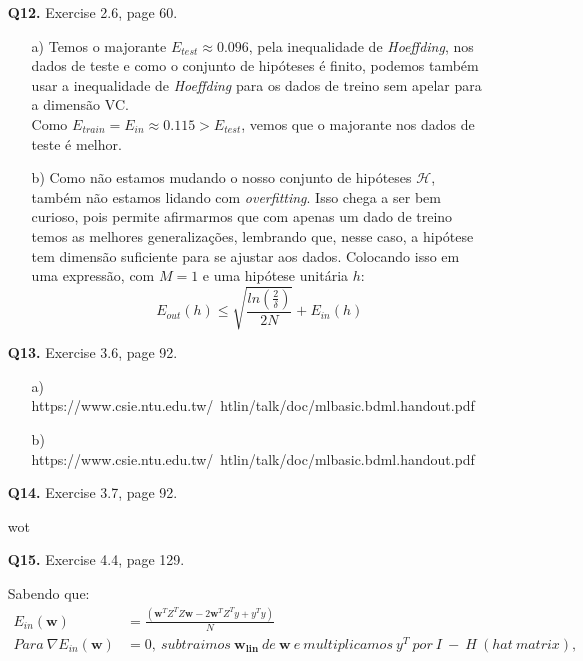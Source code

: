 \documentclass[12pt]{article}
\begin{document}
\begin{enumerate}
\item [\textbf{Q12.}] Exercise 2.6, page 60.
	\begin{addmargin}[1em]{2em}
		\begin{itemize}
			\item[a)] Temos o majorante $E_{test} \approx 0.096$, pela inequalidade de \textit{Hoeffding}, nos dados de teste e como o conjunto de hipóteses é finito, podemos também usar a inequalidade de \textit{Hoeffding} para os dados de treino sem apelar para a dimensão VC.\\
			Como $E_{train} = E_{in} \approx 0.115 > E_{test}$, vemos que o majorante nos dados de teste é melhor.
			\item[b)] Como não estamos mudando o nosso conjunto de hipóteses $\mathcal{H}$, também não estamos lidando com \textit{overfitting}. Isso chega a ser bem curioso, pois permite afirmarmos que com apenas um dado de treino temos as melhores generalizações, lembrando que, nesse caso, a  hipótese tem dimensão suficiente para se ajustar aos dados. Colocando isso em uma expressão, com $M = 1$ e uma hipótese unitária $h$: \[E_{out}(h) \leq \sqrt{\frac{ln \left( \frac{2}{\delta} \right)}{2N}} + E_{in}(h)\]
		\end{itemize}
	\end{addmargin}
\item [\textbf{Q13.}] Exercise 3.6, page 92.
	\begin{addmargin}[1em]{2em}
		\begin{itemize}
			\item[a)] https://www.csie.ntu.edu.tw/~htlin/talk/doc/mlbasic.bdml.handout.pdf
			\item[b)] https://www.csie.ntu.edu.tw/~htlin/talk/doc/mlbasic.bdml.handout.pdf
		\end{itemize}
	\end{addmargin}
\item [\textbf{Q14.}] Exercise 3.7, page 92.
	\begin{addmargin}[1em]{2em}
		wot
	\end{addmargin}
\item [\textbf{Q15.}] Exercise 4.4, page 129.
	\begin{addmargin}[1em]{2em}
		Sabendo que:
		\begin{align*}
			E_{in}(\mathbf{w}) & = \frac{(\mathbf{w}^TZ^TZ\mathbf{w} - 2 \mathbf{w}^TZ^Ty + y^Ty)}{N}\\
			Para\ \nabla E_{in}(\mathbf{w}) & = 0,\ subtraimos\ \mathbf{w_{lin}}\ de\ \mathbf{w}\ e\ multiplicamos\ y^T\ por\ I\ -\ H\ (hat\ matrix),\\

\end{align*}
\end{addmargin}
\end{enumerate}
\end{document}
